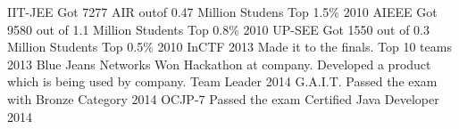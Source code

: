 \begin{cvhonors}
  \cvhonor
    {IIT-JEE}
    {Got 7277 AIR outof 0.47 Million Studens}
    {Top 1.5\%}
    {2010}
  \cvhonor
    {AIEEE}
    {Got 9580 out of 1.1 Million Students}
    {Top 0.8\%}
    {2010}
    \cvhonor
    {UP-SEE}
    {Got 1550 out of 0.3 Million Students}
    {Top 0.5\%}
    {2010}
    \cvhonor
    {InCTF 2013}
    {Made it to the finals.}
    {Top 10 teams}
    {2013}
    \cvhonor
    {Blue Jeans Networks}
    {Won Hackathon at company. Developed a product which is being used by company.}
    {Team Leader}
    {2014}
    \cvhonor
    {G.A.I.T.}
    {Passed the exam with Bronze Category}
    {}
    {2014}
    \cvhonor
    {OCJP-7}
    {Passed the exam }
    {Certified Java Developer}
    {2014}


\end{cvhonors}

